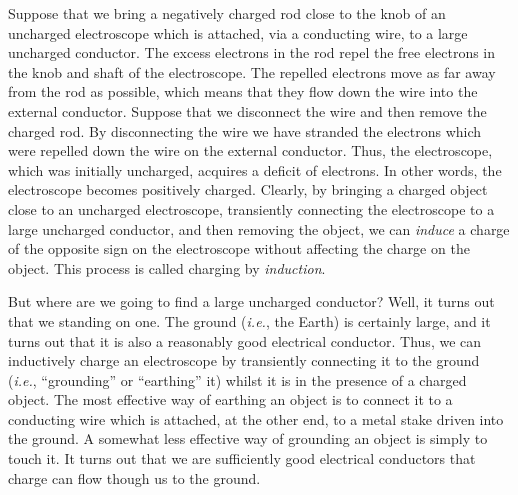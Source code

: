 Suppose that we bring a negatively charged rod close to the knob of an uncharged
electroscope which is attached, via a conducting wire, to a large uncharged
conductor.  The excess electrons in the rod repel the free electrons
in the knob and shaft of the electroscope. The repelled electrons move as far away
from the rod as possible, which means that they flow down the wire into
the external conductor. Suppose that we disconnect the wire and then remove the
charged rod. By disconnecting the wire we have stranded the electrons which were
repelled down the wire on the external conductor. Thus, the electroscope, which
was initially uncharged, acquires a deficit of electrons. In other words,
the electroscope becomes positively charged. Clearly, by bringing a charged object
close to an uncharged electroscope, transiently  connecting the electroscope to
a large uncharged conductor, and then removing the object, we can {\em induce}
a charge of the opposite sign on the electroscope without affecting  the
charge on the object. This process is called charging by {\em induction}. 

But where are we going to find a large uncharged conductor?
Well, it turns out that we standing on one. 
The ground ({\em i.e.}, the Earth)
 is certainly large, and it turns out that it is also a reasonably
good electrical conductor. Thus, we can inductively charge an electroscope by transiently
connecting it to the ground ({\em i.e.},  ``grounding'' or
``earthing'' it) whilst it is in the
presence of a charged object. The most effective way of earthing  an
object is to connect it to a conducting wire which is attached, at the other end,
to a metal stake driven into the ground. A somewhat less effective way of
grounding an object is simply to touch it. It turns out that we are sufficiently
good electrical conductors that charge can flow though us to the ground. 

